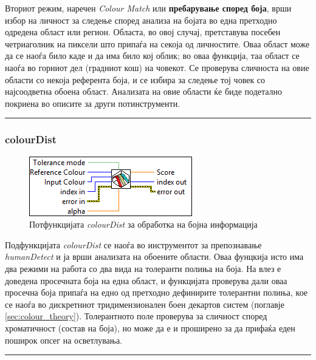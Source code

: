 \documentclass[11pt]{article}
\begin{document}
      Вториот режим, наречен \textit{Colour Match} или \textbf{пребарување според боја}, врши избор на личност за следење според анализа на бојата во една претходно одредена област или регион. Областа, во овој случај, претставува посебен четриаголник на пиксели што припаѓа на секоја од личностите. Оваа област може да се наоѓа било каде и да има било кој облик; во оваа функција, таа област се наоѓа во горниот дел (градниот кош) на човекот. Се проверува сличноста на овие области со некоја референта боја, и се избира за следење тој човек со најсоодветна обоена област. Анализата на овие области ќе биде подетално покриена во описите за други потинструменти.\\
      \textcolor[RGB]{150,150,150}{\rule{\linewidth}{1.6pt}}

    \subsubsection{colourDist} \label{sec:colourDist}
	    \begin{figure}[H]
	      \includegraphics[width=0.55\linewidth]{./images/colourDist_border.png}
		    \caption{Потфункцијата \textit{colourDist} за обработка на бојна информација}
	      \label{fig:colourDist.png}
	      \raggedright
	      \end{figure}
      Подфункцијата \textit{colourDist} се наоѓа во инструментот за препознавање \textit{humanDetect} и ја врши анализата на обоените области. Оваа фунцкија исто има два режими на работа со два вида на толеранти полиња на боја. На влез е доведена просечната боја на една област, и функцијата проверува дали оваа просечна боја припаѓа на едно од претходно дефинирите толерантни полиња, кое се наоѓа во дискретниот тридимензионален боен декартов систем (поглавје \ref{sec:colour_theory}). Толерантното поле проверува за сличност според хроматичност (состав на боја), но може да е и проширено за да прифаќа еден поширок опсег на осветлувања.\\
      \textcolor[RGB]{150,150,150}{\rule{\linewidth}{1.6pt}}
\end{document}
